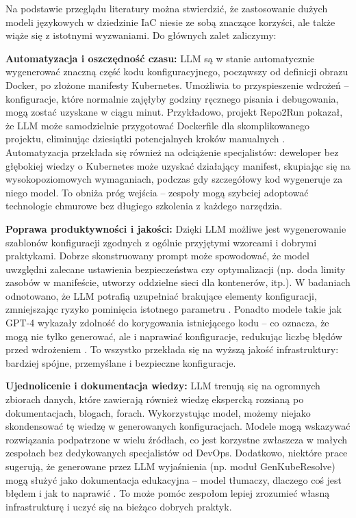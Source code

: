 Na podstawie przeglądu literatury można stwierdzić, że zastosowanie dużych modeli językowych w dziedzinie IaC niesie ze sobą znaczące korzyści, ale także wiąże się z istotnymi wyzwaniami. Do głównych zalet zaliczymy:

\textbf{Automatyzacja i oszczędność czasu:} LLM są w stanie automatycznie wygenerować znaczną część kodu konfiguracyjnego, począwszy od definicji obrazu Docker, po złożone manifesty Kubernetes. Umożliwia to przyspieszenie wdrożeń – konfiguracje, które normalnie zajęłyby godziny ręcznego pisania i debugowania, mogą zostać uzyskane w ciągu minut. Przykładowo, projekt Repo2Run pokazał, że LLM może samodzielnie przygotować Dockerfile dla skomplikowanego projektu, eliminując dziesiątki potencjalnych kroków manualnych \cite{hu_llm-based_2025}. Automatyzacja przekłada się również na odciążenie specjalistów: deweloper bez głębokiej wiedzy o Kubernetes może uzyskać działający manifest, skupiając się na wysokopoziomowych wymaganiach, podczas gdy szczegółowy kod wygeneruje za niego model. To obniża próg wejścia – zespoły mogą szybciej adoptować technologie chmurowe bez długiego szkolenia z każdego narzędzia.

\textbf{Poprawa produktywności i jakości:} Dzięki LLM możliwe jest wygenerowanie szablonów konfiguracji zgodnych z ogólnie przyjętymi wzorcami i dobrymi praktykami. Dobrze skonstruowany prompt może spowodować, że model uwzględni zalecane ustawienia bezpieczeństwa czy optymalizacji (np. doda limity zasobów w manifeście, utworzy oddzielne sieci dla kontenerów, itp.). W badaniach odnotowano, że LLM potrafią uzupełniać brakujące elementy konfiguracji, zmniejszając ryzyko pominięcia istotnego parametru \cite{kratzke_dont_2024}. Ponadto modele takie jak GPT-4 wykazały zdolność do korygowania istniejącego kodu – co oznacza, że mogą nie tylko generować, ale i naprawiać konfiguracje, redukując liczbę błędów przed wdrożeniem \cite{low_repairing_2024}. To wszystko przekłada się na wyższą jakość infrastruktury: bardziej spójne, przemyślane i bezpieczne konfiguracje.

\textbf{Ujednolicenie i dokumentacja wiedzy:} LLM trenują się na ogromnych zbiorach danych, które zawierają również wiedzę ekspercką rozsianą po dokumentacjach, blogach, forach. Wykorzystując model, możemy niejako skondensować tę wiedzę w generowanych konfiguracjach. Modele mogą wskazywać rozwiązania podpatrzone w wielu źródłach, co jest korzystne zwłaszcza w małych zespołach bez dedykowanych specjalistów od DevOps. Dodatkowo, niektóre prace sugerują, że generowane przez LLM wyjaśnienia (np. moduł GenKubeResolve) mogą służyć jako dokumentacja edukacyjna – model tłumaczy, dlaczego coś jest błędem i jak to naprawić \cite{malul_genkubesec_2024}. To może pomóc zespołom lepiej zrozumieć własną infrastrukturę i uczyć się na bieżąco dobrych praktyk.

